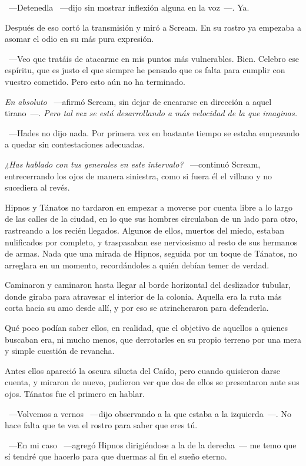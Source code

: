 ~---Detenedla ~---dijo sin mostrar inflexión alguna en la voz~---. Ya.

Después de eso cortó la transmisión y miró a Scream. En su rostro ya empezaba a asomar el odio en su más pura expresión.

~---Veo que tratáis de atacarme en mis puntos más vulnerables. Bien. Celebro ese espíritu, que es justo el que siempre he pensado que os falta para cumplir con vuestro cometido. Pero esto aún no ha terminado.

\emph{En absoluto} ~---afirmó Scream, sin dejar de encararse en dirección a aquel tirano~---. \emph{Pero tal vez se está desarrollando a más velocidad de la que imaginas.}

~---Hades no dijo nada. Por primera vez en bastante tiempo se estaba empezando a quedar sin contestaciones adecuadas.

\emph{¿Has hablado con tus generales en este intervalo?} ~---continuó Scream, entrecerrando los ojos de manera siniestra, como si fuera él el villano y no sucediera al revés.

\parbreak
Hipnos y Tánatos no tardaron en empezar a moverse por cuenta libre a lo largo de las calles de la ciudad, en lo que sus hombres circulaban de un lado para otro, rastreando a los recién llegados. Algunos de ellos, muertos del miedo, estaban nulificados por completo, y traspasaban ese nerviosismo al resto de sus hermanos de armas. Nada que una mirada de Hipnos, seguida por un toque de Tánatos, no arreglara en un momento, recordándoles a quién debían temer de verdad.

Caminaron y caminaron hasta llegar al borde horizontal del deslizador tubular, donde giraba para atravesar el interior de la colonia. Aquella era la ruta más corta hacia su amo desde allí, y por eso se atrincheraron para defenderla.

Qué poco podían saber ellos, en realidad, que el objetivo de aquellos a quienes buscaban era, ni mucho menos, que derrotarles en su propio terreno por una mera y simple cuestión de revancha.

Antes ellos apareció la oscura silueta del Caído, pero cuando quisieron darse cuenta, y miraron de nuevo, pudieron ver que dos de ellos se presentaron ante sus ojos. Tánatos fue el primero en hablar.

~---Volvemos a vernos ~---dijo observando a la que estaba a la izquierda~---. No hace falta que te vea el rostro para saber que eres tú.

~---En mi caso ~---agregó Hipnos dirigiéndose a la de la derecha~--- me temo que sí tendré que hacerlo para que duermas al fin el sueño eterno.

